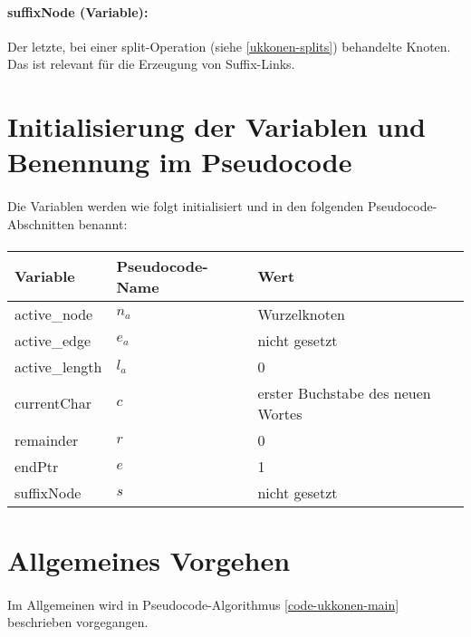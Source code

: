 \paragraph{suffixNode (Variable):} Der letzte, bei einer split-Operation (siehe \ref{ukkonen-splits}) behandelte Knoten. Das ist relevant für die Erzeugung von Suffix-Links.

\section{Initialisierung der Variablen und Benennung im Pseudocode}

\paragraph{} Die Variablen werden wie folgt initialisiert und in den folgenden Pseudocode-Abschnitten benannt:
\paragraph{}
\begin{tabularx}{\textwidth}{llX}
\hline
\textbf{Variable} & \textbf{Pseudocode-Name} & \textbf{Wert} \\ [0.1cm]
\hline
active\_node & $n_a$ & Wurzelknoten \\ [0.1cm]
\hline
active\_edge & $e_a$ & nicht gesetzt \\ [0.1cm]
\hline
active\_length & $l_a$ & 0 \\ [0.1cm]
\hline
currentChar & $c$ & erster Buchstabe des neuen Wortes \\ [0.1cm]
\hline
remainder & $r$ & 0 \\ [0.1cm]
\hline
endPtr & $e$ & 1 \\ [0.1cm]
\hline
suffixNode & $s$ & nicht gesetzt \\ [0.1cm]
\hline
\end{tabularx}

\newpage

\section{Allgemeines Vorgehen}

\paragraph{} Im Allgemeinen wird in Pseudocode-Algorithmus \ref{code-ukkonen-main} beschrieben vorgegangen.

